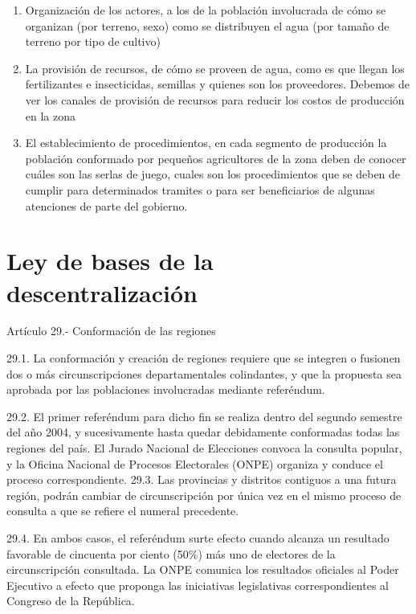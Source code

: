 \documentclass[
  jou,
  floatsintext,
  longtable,
  a4paper,
  nolmodern,
  notxfonts,
  notimes,
  12pt,
  colorlinks=true,linkcolor=blue,citecolor=blue,urlcolor=blue]{apa7}
\providecommand{\tightlist}{%
  \setlength{\itemsep}{0pt}\setlength{\parskip}{0pt}}
\begin{document}
\begin{enumerate}
\def\labelenumi{\arabic{enumi}.}
\tightlist
\item
  Organización de los actores, a los de la población involucrada de cómo
  se organizan (por terreno, sexo) como se distribuyen el agua (por
  tamaño de terreno por tipo de cultivo)
\item
  La provisión de recursos, de cómo se proveen de agua, como es que
  llegan los fertilizantes e insecticidas, semillas y quienes son los
  proveedores. Debemos de ver los canales de provisión de recursos para
  reducir los costos de producción en la zona
\item
  El establecimiento de procedimientos, en cada segmento de producción
  la población conformado por pequeños agricultores de la zona deben de
  conocer cuáles son las serlas de juego, cuales son los procedimientos
  que se deben de cumplir para determinados tramites o para ser
  beneficiarios de algunas atenciones de parte del gobierno.
\end{enumerate}

\section{Ley de bases de la
descentralización}\label{ley-de-bases-de-la-descentralizaciuxf3n}

Artículo 29.- Conformación de las regiones

29.1. La conformación y creación de regiones requiere que se integren o
fusionen dos o más circunscripciones departamentales colindantes, y que
la propuesta sea aprobada por las poblaciones involucradas mediante
referéndum.

29.2. El primer referéndum para dicho fin se realiza dentro del segundo
semestre del año 2004, y sucesivamente hasta quedar debidamente
conformadas todas las regiones del país. El Jurado Nacional de
Elecciones convoca la consulta popular, y la Oficina Nacional de
Procesos Electorales (ONPE) organiza y conduce el proceso
correspondiente. 29.3. Las provincias y distritos contiguos a una futura
región, podrán cambiar de circunscripción por única vez en el mismo
proceso de consulta a que se refiere el numeral precedente.

29.4. En ambos casos, el referéndum surte efecto cuando alcanza un
resultado favorable de cincuenta por ciento (50\%) más uno de electores
de la circunscripción consultada. La ONPE comunica los resultados
oficiales al Poder Ejecutivo a efecto que proponga las iniciativas
legislativas correspondientes al Congreso de la República.
\end{document}
